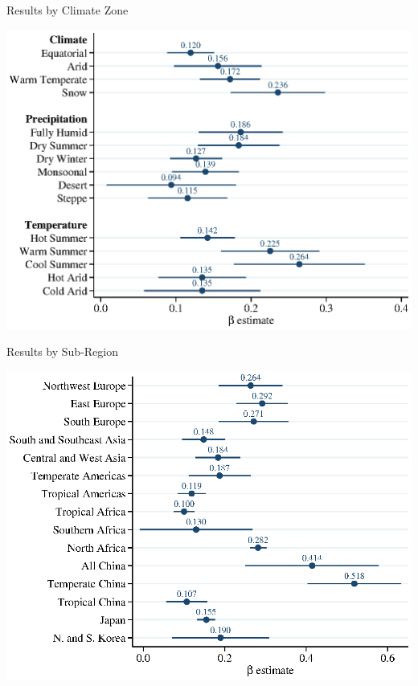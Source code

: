\documentclass[10pt, xcolor=dvipsnames]{beamer}
\begin{document}
\begin{frame}{Results by Climate Zone}\label{climate}
\begin{center}
\includegraphics[width=.8\textwidth]{fig_coef_kg_base.eps}
\end{center}
\hfill \hyperlink{climatereg}{}
\end{frame}

\begin{frame}{Results by Sub-Region}\label{subregion}
\begin{center}
\includegraphics[width=.8\textwidth]{fig_coef_subregion_base.eps}
\end{center}
\hfill \hyperlink{subregiontab}{}
\end{frame}
\end{document}
